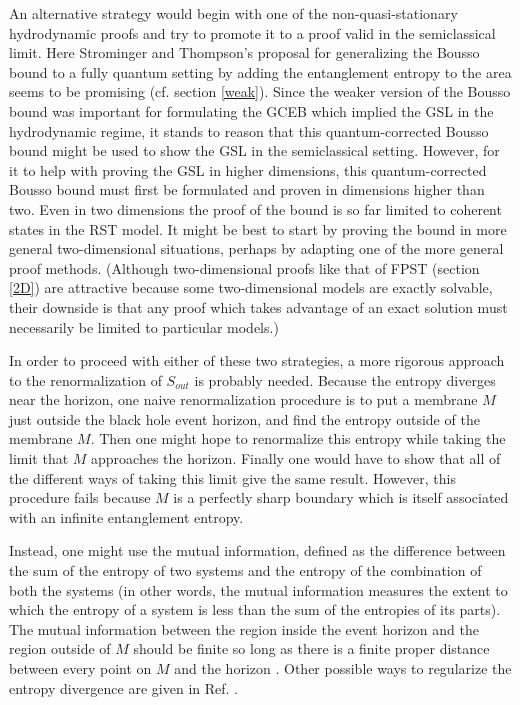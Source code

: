 \documentclass{article}
\begin{document}
An alternative strategy would begin with one of the non-quasi-stationary hydrodynamic proofs and try to promote it to a proof valid in the semiclassical limit.  Here Strominger and Thompson's proposal \cite{ST04} for generalizing the Bousso bound to a fully quantum setting by adding the entanglement entropy to the area seems to be promising (cf. section \ref{weak}).  Since the weaker version of the Bousso bound was important for formulating the GCEB which implied the GSL in the hydrodynamic regime, it stands to reason that this quantum-corrected Bousso bound might be used to show the GSL in the semiclassical setting.  However, for it to help with proving the GSL in higher dimensions, this quantum-corrected Bousso bound must first be formulated and proven in dimensions higher than two.  Even in two dimensions the proof of the bound is so far limited to coherent states in the RST model.  It might be best to start by proving the bound in more general two-dimensional situations, perhaps by adapting one of the more general proof methods.  (Although two-dimensional proofs like that of FPST \cite{fiola94} (section \ref{2D}) are attractive because some two-dimensional models are exactly solvable, their downside is that any proof which takes advantage of an exact solution must necessarily be limited to particular models.)

In order to proceed with either of these two strategies, a more rigorous approach to the renormalization of $S_{out}$ is probably needed.  Because the entropy diverges near the horizon, one naive renormalization procedure is to put a membrane $M$ just outside the black hole event horizon, and find the entropy outside of the membrane $M$.  Then one might hope to renormalize this entropy while taking the limit that $M$ approaches the horizon.  Finally one would have to show that all of the different ways of taking this limit give the same result.  However, this procedure fails because $M$ is a perfectly sharp boundary which is itself associated with an infinite entanglement entropy.

Instead, one might use the mutual information, defined as the difference between the sum of the entropy of two systems and the entropy of the combination of both the systems (in other words, the mutual information measures the extent to which the entropy of a system is less than the sum of the entropies of its parts).  The mutual information between the region inside the event horizon and the region outside of $M$ should be finite so long as there is a finite proper distance between every point on $M$ and the horizon \cite{CM04}.  Other possible ways to regularize the entropy divergence are given in Ref. \cite{BKLS86}.
\end{document}
